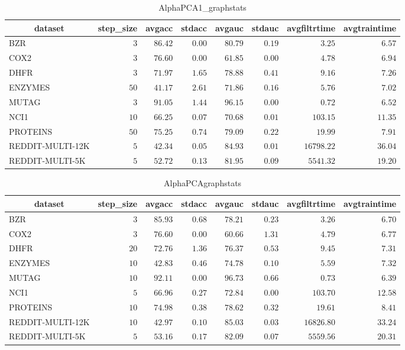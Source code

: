 \begin{table}[!tbp]
\caption{AlphaPCA1_graphstats\label{AlphaPCA1_graphstats}} 
{\centering
\begin{tabular}{lrrrrrrr}
\hline\hline
\multicolumn{1}{c}{dataset}&\multicolumn{1}{c}{step_size}&\multicolumn{1}{c}{avgacc}&\multicolumn{1}{c}{stdacc}&\multicolumn{1}{c}{avgauc}&\multicolumn{1}{c}{stdauc}&\multicolumn{1}{c}{avgfiltrtime}&\multicolumn{1}{c}{avgtraintime}\tabularnewline
\hline
BZR&$ 3$&$86.42$&$0.00$&$80.79$&$0.19$&$    3.25$&$ 6.57$\tabularnewline
COX2&$ 3$&$76.60$&$0.00$&$61.85$&$0.00$&$    4.78$&$ 6.94$\tabularnewline
DHFR&$ 3$&$71.97$&$1.65$&$78.88$&$0.41$&$    9.16$&$ 7.26$\tabularnewline
ENZYMES&$50$&$41.17$&$2.61$&$71.86$&$0.16$&$    5.76$&$ 7.02$\tabularnewline
MUTAG&$ 3$&$91.05$&$1.44$&$96.15$&$0.00$&$    0.72$&$ 6.52$\tabularnewline
NCI1&$10$&$66.25$&$0.07$&$70.68$&$0.01$&$  103.15$&$11.35$\tabularnewline
PROTEINS&$50$&$75.25$&$0.74$&$79.09$&$0.22$&$   19.99$&$ 7.91$\tabularnewline
REDDIT-MULTI-12K&$ 5$&$42.34$&$0.05$&$84.93$&$0.01$&$16798.22$&$36.04$\tabularnewline
REDDIT-MULTI-5K&$ 5$&$52.72$&$0.13$&$81.95$&$0.09$&$ 5541.32$&$19.20$\tabularnewline
\hline
\end{tabular}}
\end{table}
\begin{table}[!tbp]
\caption{AlphaPCAgraphstats\label{AlphaPCAgraphstats}} 
{\centering
\begin{tabular}{lrrrrrrr}
\hline\hline
\multicolumn{1}{c}{dataset}&\multicolumn{1}{c}{step_size}&\multicolumn{1}{c}{avgacc}&\multicolumn{1}{c}{stdacc}&\multicolumn{1}{c}{avgauc}&\multicolumn{1}{c}{stdauc}&\multicolumn{1}{c}{avgfiltrtime}&\multicolumn{1}{c}{avgtraintime}\tabularnewline
\hline
BZR&$ 3$&$85.93$&$0.68$&$78.21$&$0.23$&$    3.26$&$ 6.70$\tabularnewline
COX2&$ 3$&$76.60$&$0.00$&$60.66$&$1.31$&$    4.79$&$ 6.77$\tabularnewline
DHFR&$20$&$72.76$&$1.36$&$76.37$&$0.53$&$    9.45$&$ 7.31$\tabularnewline
ENZYMES&$10$&$42.83$&$0.46$&$74.78$&$0.10$&$    5.59$&$ 7.32$\tabularnewline
MUTAG&$10$&$92.11$&$0.00$&$96.73$&$0.66$&$    0.73$&$ 6.39$\tabularnewline
NCI1&$ 5$&$66.96$&$0.27$&$72.84$&$0.00$&$  103.70$&$12.58$\tabularnewline
PROTEINS&$10$&$74.98$&$0.38$&$78.62$&$0.32$&$   19.61$&$ 8.41$\tabularnewline
REDDIT-MULTI-12K&$10$&$42.97$&$0.10$&$85.03$&$0.03$&$16826.80$&$33.24$\tabularnewline
REDDIT-MULTI-5K&$ 5$&$53.16$&$0.17$&$82.09$&$0.07$&$ 5559.56$&$20.31$\tabularnewline
\hline
\end{tabular}}
\end{table}
